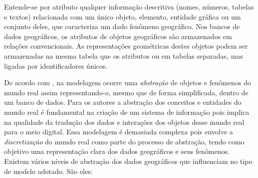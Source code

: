 \begin{citacao}
    Entende-se por atributo qualquer informação descritiva (nomes, números, tabelas e textos) relacionada com um único objeto, elemento, entidade gráfica ou um conjunto deles, que caracteriza um dado fenômeno geográfico. Nos bancos de dados geográficos, os atributos de objetos geográficos são armazenados em relações convencionais. As representações geométricas destes objetos podem ser armazenadas na mesma tabela que os atributos ou em tabelas separadas, mas ligadas por identificadores únicos.\cite[p.30]{queiroz2006tutorial} 
\end{citacao}
De acordo com , na modelagem ocorre uma \textit{abstração} de objetos e fenômenos do mundo real assim representando-o, mesmo que de forma simplificada, dentro de um banco de dados. Para os autores a abstração dos conceitos e entidades do mundo real é fundamental na criação de um sistema de informação pois implica na qualidade da tradução dos dados e interações dos objetos desse mundo real para o meio digital. Essa modelagem é demasiada complexa pois envolve a \textit{discretização} do mundo real como parte do processo de abstração, tendo como objetivo uma representação clara dos dados geográficos e seus fenômenos. Existem vários níveis de abstração dos dados geográficos que influenciam no tipo de modelo adotado. São eles:


